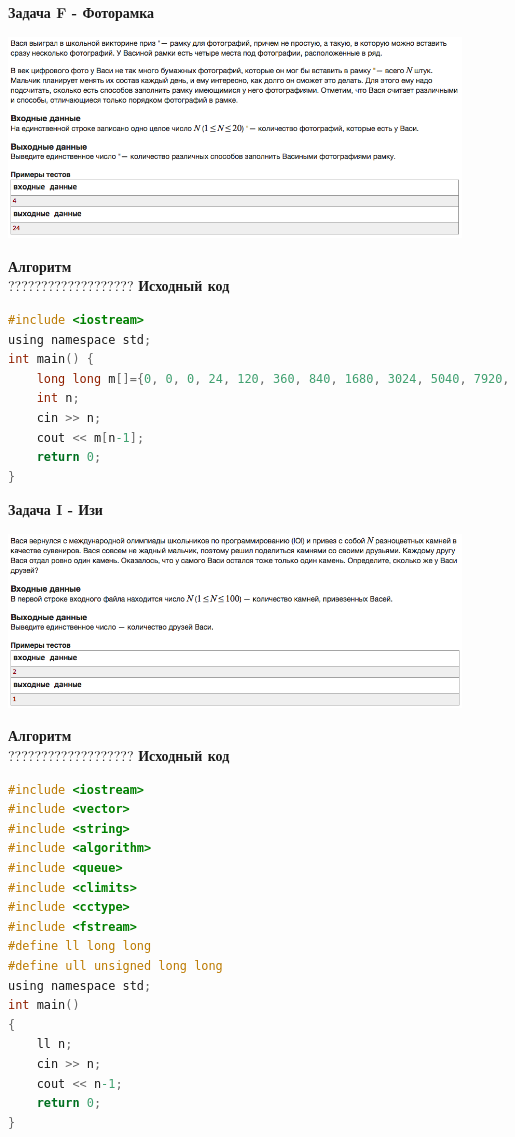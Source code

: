 \documentclass[a4paper,12pt]{article}
\begin{document}
\newpage
\textbf{{\large Задача F - Фоторамка}} \\
\begin{center}
\includegraphics[width=0.9\textwidth]{CT_school_nn/CT_school_nn_F.png}\\ [1cm]
\end{center}
\textbf{{\large Алгоритм}} \\
{\Huge ???????????????????}
\newpage
\textbf{{\large Исходный код}} \\
\begin{lstlisting}[language=C]
#include <iostream>
using namespace std;
int main() {
    long long m[]={0, 0, 0, 24, 120, 360, 840, 1680, 3024, 5040, 7920, 11880, 17160, 24024, 32760, 43680, 57120, 73440, 93024, 116280};
    int n;
    cin >> n;
    cout << m[n-1];
    return 0;
}
\end{lstlisting}

\newpage
\textbf{{\large Задача I - Изи}} \\
\begin{center}
\includegraphics[width=0.9\textwidth]{CT_school_nn/CT_school_nn_I.png}\\ [1cm]
\end{center}
\textbf{{\large Алгоритм}} \\
{\Huge ???????????????????}
\newpage
\textbf{{\large Исходный код}} \\
\begin{lstlisting}[language=C]
#include <iostream>
#include <vector>
#include <string>
#include <algorithm>
#include <queue>
#include <climits>
#include <cctype>
#include <fstream>
#define ll long long
#define ull unsigned long long
using namespace std;
int main()
{
    ll n;
    cin >> n;
    cout << n-1;
    return 0;
}
\end{lstlisting}
\end{document}
